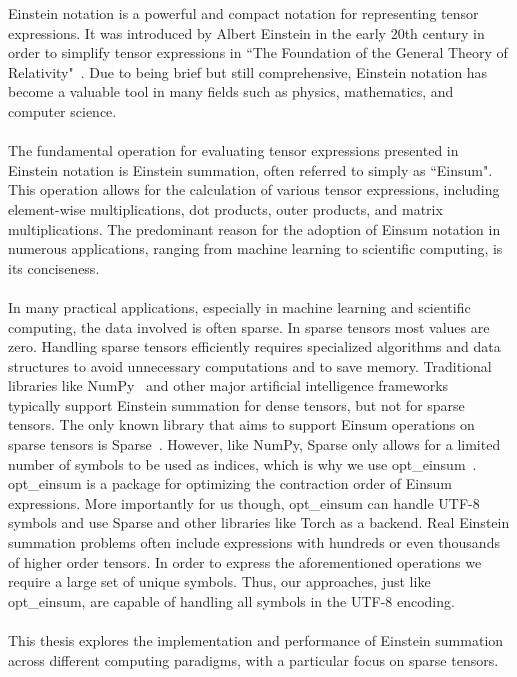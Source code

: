 Einstein notation is a powerful and compact notation for representing
tensor expressions. It was introduced by Albert Einstein in the early 20th century
in order to simplify tensor expressions in ``The Foundation of the General Theory of
Relativity"~\cite{einstein1916}. Due to being brief but still comprehensive, Einstein
notation has become a valuable tool in many fields such as physics, mathematics, and
computer science.
\\\\
The fundamental operation for evaluating tensor expressions presented in Einstein
notation is Einstein summation, often referred to simply as ``Einsum". This operation
allows for the calculation of various tensor expressions, including element-wise
multiplications, dot products, outer products, and matrix multiplications. The predominant
reason for the adoption of Einsum notation in numerous applications, ranging from machine
learning to scientific computing, is its conciseness.
\\\\
In many practical applications, especially in machine learning and scientific computing,
the data involved is often sparse. In sparse tensors most values are zero. Handling sparse
tensors efficiently requires specialized algorithms and data structures to avoid
unnecessary computations and to save memory. Traditional libraries like NumPy~\cite{numpy}
and other major artificial intelligence frameworks~\cite{tensorflow, pytorch} typically
support Einstein summation for dense tensors, but not for sparse tensors. The only known
library that aims to support Einsum operations on sparse tensors is Sparse~\cite{sparse}.
However, like NumPy, Sparse only allows for a limited number of symbols to be used as
indices, which is why we use opt\_einsum~\cite{opt_einsum}. opt\_einsum is a package for
optimizing the contraction order of Einsum expressions. More importantly for us though,
opt\_einsum can handle UTF-8 symbols and use Sparse and other libraries like Torch
as a backend. Real Einstein summation problems often include expressions with hundreds or
even thousands of higher order tensors. In order to express the aforementioned operations
we require a large set of unique symbols. Thus, our approaches, just like opt\_einsum, are
capable of handling all symbols in the UTF-8 encoding.
\\\\
This thesis explores the implementation and performance of Einstein summation
across different computing paradigms, with a particular focus on sparse tensors.
